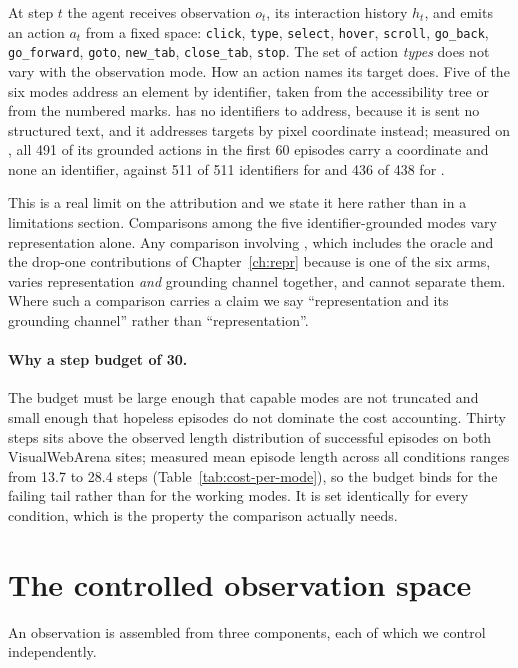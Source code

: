 At step $t$ the agent receives observation $o_t$, its interaction history $h_t$,
and emits an action $a_t$ from a fixed space: \texttt{click}, \texttt{type},
\texttt{select}, \texttt{hover}, \texttt{scroll}, \texttt{go\_back},
\texttt{go\_forward}, \texttt{goto}, \texttt{new\_tab}, \texttt{close\_tab},
\texttt{stop}. The set of action \emph{types} does not vary with the observation
mode. How an action names its target does. Five of the six modes address an
element by identifier, taken from the accessibility tree or from the numbered
marks. \mVis{} has no identifiers to address, because it is sent no structured
text, and it addresses targets by pixel coordinate instead; measured on
, all 491 of its grounded actions in the first 60 episodes
carry a coordinate and none an identifier, against 511 of 511 identifiers for
\mDOM{} and 436 of 438 for \mSoM{}.

This is a real limit on the attribution and we state it here rather than in a
limitations section. Comparisons among the five identifier-grounded modes vary
representation alone. Any comparison involving \mVis{}, which includes the
oracle and the drop-one contributions of Chapter~\ref{ch:repr} because \mVis{}
is one of the six arms, varies representation \emph{and} grounding channel
together, and cannot separate them. Where such a comparison carries a claim we
say ``representation and its grounding channel'' rather than
``representation''.

\paragraph{Why a step budget of 30.} The budget must be large enough that
capable modes are not truncated and small enough that hopeless episodes do not
dominate the cost accounting. Thirty steps sits above the observed length
distribution of successful episodes on both VisualWebArena sites; measured mean
episode length across all conditions ranges from 13.7 to 28.4 steps
(Table~\ref{tab:cost-per-mode}), so the budget binds for the failing tail rather
than for the working modes. It is set identically for every condition, which is
the property the comparison actually needs.

\FloatBarrier
\section{The controlled observation space}
\label{sec:obs-space}

An observation is assembled from three components, each of which we control
independently.

